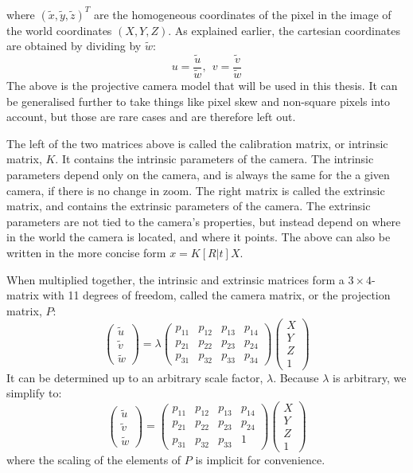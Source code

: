 where $(\tilde{x},\tilde{y},\tilde{z})^T$ are the homogeneous coordinates of the pixel in the image of the world coordinates $(X,Y,Z)$.
As explained earlier, the cartesian coordinates are obtained by dividing by $\tilde{w}$:
$$
u = \frac{\tilde{u}}{\tilde{w}},~~v = \frac{\tilde{v}}{\tilde{w}}
$$
The above is the projective camera model that will be used in this thesis. 
It can be generalised further to take things like pixel skew and non-square pixels into account, but those are rare cases and are therefore left out.

The left of the two matrices above is called the calibration matrix, or intrinsic matrix, $K$.
It contains the intrinsic parameters of the camera.
The intrinsic parameters depend only on the camera, and is always the same for the a given camera, if there is no change in zoom.
The right matrix is called the extrinsic matrix, and contains the extrinsic parameters of the camera.
The extrinsic parameters are not tied to the camera's properties, but instead depend on where in the world the camera is located, and where it points.
The above can also be written in the more concise form $x = K[R|t]X$.

When multiplied together, the intrinsic and extrinsic matrices form a $3\times4$-matrix with 11 degrees of freedom, called the camera matrix, or the projection matrix, $P$:
$$\begin{pmatrix} \tilde{u} \\ \tilde{v} \\ \tilde{w} \end{pmatrix} = \lambda
\begin{pmatrix} p_{11} & p_{12} & p_{13} & p_{14} \\
 				p_{21} & p_{22} & p_{23} & p_{24} \\
				p_{31} & p_{32} & p_{33} & p_{34} \end{pmatrix}
\begin{pmatrix}X \\Y \\Z \\1\end{pmatrix}$$
It can be determined up to an arbitrary scale factor, $\lambda$.
Because $\lambda$ is arbitrary, we simplify to:
$$\begin{pmatrix} \tilde{u} \\ \tilde{v} \\ \tilde{w} \end{pmatrix} =
\begin{pmatrix} p_{11} & p_{12} & p_{13} & p_{14} \\
 				p_{21} & p_{22} & p_{23} & p_{24} \\
				p_{31} & p_{32} & p_{33} & 1 \end{pmatrix}
\begin{pmatrix}X \\Y \\Z \\1\end{pmatrix}$$
where the scaling of the elements of $P$ is implicit for convenience. \cite[153-165]{hartley-zisserman}


